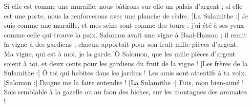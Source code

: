 \begin{multicols}{2}
Si elle est comme une muraille, nous bâtirons sur elle un palais d'argent ; si elle est une porte, nous la renforcerons avec une planche de cèdre.
[La Sulamithe :] Je suis comme une muraille, et mes seins sont comme des tours ; j'ai été à ses yeux comme celle qui trouve la paix.
Salomon avait une vigne à Baal-Hamon ; il remit la vigne à des gardiens ; chacun apportait pour son fruit mille pièces d'argent.
Ma vigne, qui est à moi, je la garde. Ô Salomon, que les mille pièces d'argent soient à toi, et deux cents pour les gardiens du fruit de la vigne !
[Les frères de la Sulamithe :] Ô toi qui habites dans les jardins ! Les amis sont attentifs à ta voix. [Salomon :] Daigne me la faire entendre !
[La Sulamithe :] Fuis, mon bien-aimé ! Sois semblable à la gazelle ou au faon des biches, sur les montagnes des aromates !
\PPE{}
\end{multicols}
